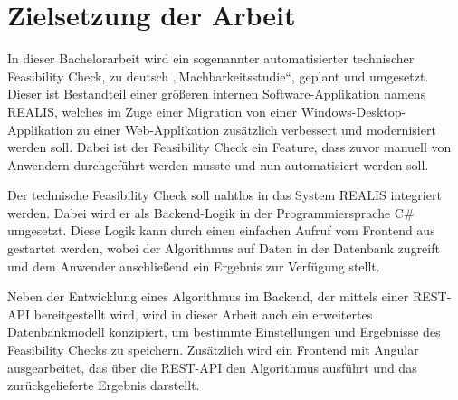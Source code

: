 \section{Zielsetzung der Arbeit}
In dieser Bachelorarbeit wird ein sogenannter automatisierter technischer Feasibility Check, zu deutsch „Machbarkeitsstudie“, geplant und umgesetzt. Dieser ist Bestandteil einer größeren internen Software-Applikation namens \gls{REALIS}, welches
im Zuge einer Migration von einer Windows-Desktop-Applikation zu einer Web-Applikation zusätzlich verbessert und modernisiert werden soll. Dabei ist der Feasibility Check ein Feature, dass zuvor manuell von Anwendern durchgeführt werden musste und nun automatisiert werden soll.

Der technische Feasibility Check soll nahtlos in das System \gls{REALIS} integriert werden. Dabei wird er als Backend-Logik in der Programmiersprache C\# umgesetzt. Diese Logik kann durch einen einfachen Aufruf vom Frontend aus gestartet werden, wobei der Algorithmus auf Daten in der Datenbank zugreift und dem Anwender anschließend ein Ergebnis zur Verfügung stellt.

Neben der Entwicklung eines Algorithmus im Backend, der mittels einer REST-API bereitgestellt wird, wird in dieser Arbeit auch ein erweitertes Datenbankmodell konzipiert, um bestimmte Einstellungen und Ergebnisse des Feasibility Checks zu speichern. Zusätzlich wird ein Frontend mit Angular ausgearbeitet, das über die REST-API den Algorithmus ausführt und das zurückgelieferte Ergebnis darstellt.